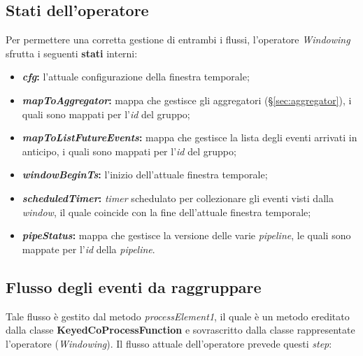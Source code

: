 \subsection{Stati dell'operatore}\label{sec:stati-windowing}
Per permettere una corretta gestione di entrambi i flussi, l'operatore \textit{Windowing} sfrutta i seguenti \textbf{stati} interni:
\begin{itemize}
		\item{\textbf{\textit{cfg}:} l'attuale configurazione della finestra temporale;}
		\item{\textbf{\textit{mapToAggregator}:} mappa che gestisce gli aggregatori (\S\ref{sec:aggregator}), i quali sono mappati per l'\textit{id} del gruppo;}
		\item{\textbf{\textit{mapToListFutureEvents}:} mappa che gestisce la lista degli eventi arrivati in anticipo, i quali sono mappati per l'\textit{id} del gruppo;}
		\item{\textbf{\textit{windowBeginTs}:} l'inizio dell'attuale finestra temporale;}
		\item{\textbf{\textit{scheduledTimer}:} \textit{timer} schedulato per collezionare gli eventi visti dalla \textit{window}, il quale coincide con la fine dell'attuale finestra temporale;}
		\item{\textbf{\textit{pipeStatus}:} mappa che gestisce la versione delle varie \textit{\gls{pipeline}}, le quali sono mappate per l'\textit{id} della \textit{\gls{pipeline}}.}
\end{itemize}


\subsection{Flusso degli eventi da raggruppare}\label{sec:pr1-windowing}
Tale flusso è gestito dal metodo \textit{processElement1}, il quale è un metodo ereditato dalla classe \textbf{KeyedCoProcessFunction} e sovrascritto dalla classe rappresentate l'operatore (\textit{Windowing}). Il flusso attuale dell'operatore prevede questi \textit{step}:

